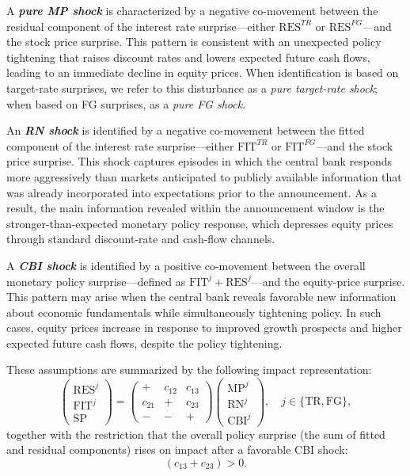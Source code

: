 \documentclass[12pt, reqno]{article}
\begin{document}
A \emph{\textbf{pure MP shock}} is characterized by a negative co-movement between the residual component of the interest rate surprise—either $\text{RES}^{TR}$ or $\text{RES}^{FG}$—and the stock price surprise. This pattern is consistent with an unexpected policy tightening that raises discount rates and lowers expected future cash flows, leading to an immediate decline in equity prices. When identification is based on target-rate surprises, we refer to this disturbance as a \emph{pure target-rate shock}; when based on FG surprises, as a \emph{pure FG shock}.

An \emph{\textbf{RN shock}} is identified by a negative co-movement between the fitted component of the interest rate surprise—either $\text{FIT}^{TR}$ or $\text{FIT}^{FG}$—and the stock price surprise. This shock captures episodes in which the central bank responds more aggressively than markets anticipated to publicly available information that was already incorporated into expectations prior to the announcement. As a result, the main information revealed within the announcement window is the stronger-than-expected monetary policy response, which depresses equity prices through standard discount-rate and cash-flow channels.

A \emph{\textbf{CBI shock}} is identified by a positive co-movement between the overall monetary policy surprise—defined as $\text{FIT}^{j}+\text{RES}^{j}$—and the equity-price surprise. This pattern may arise when the central bank reveals favorable new information about economic fundamentals while simultaneously tightening policy. In such cases, equity prices increase in response to improved growth prospects and higher expected future cash flows, despite the policy tightening.

These assumptions are summarized by the following impact representation:
\begin{equation}
\begin{pmatrix}
\text{RES}^{j} \\
\text{FIT}^{j} \\
\text{SP}
\end{pmatrix}
=
\begin{pmatrix}
+ & c_{12} & c_{13} \\
c_{21} & + & c_{23} \\
- & - & +
\end{pmatrix}
\begin{pmatrix}
\text{MP}^{j} \\
\text{RN}^{j} \\
\text{CBI}^{j}
\end{pmatrix},
\quad j \in \{\text{TR}, \text{FG}\},
\end{equation}
together with the restriction that the overall policy surprise (the sum of fitted and residual components) rises on impact after a favorable CBI shock:
\begin{equation}
\label{eq:cbi_policy_surprise}
(c_{13}+c_{23}) > 0.
\end{equation}
\end{document}

